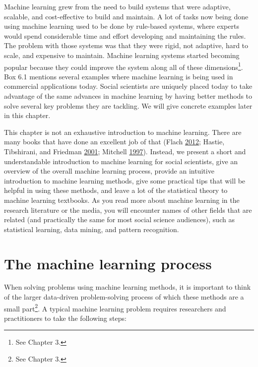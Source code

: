 \documentclass[]{krantz}
\begin{document}
Machine learning grew from the need to build systems that were adaptive,
scalable, and cost-effective to build and maintain. A lot of tasks now
being done using machine learning used to be done by rule-based systems,
where experts would spend considerable time and effort developing and
maintaining the rules. The problem with those systems was that they were
rigid, not adaptive, hard to scale, and expensive to maintain. Machine
learning systems started becoming popular because they could improve the
system along all of these dimensions\footnote{See Chapter 3.}. Box 6.1
mentions several examples where machine learning is being used in
commercial applications today. Social scientists are uniquely placed
today to take advantage of the same advances in machine learning by
having better methods to solve several key problems they are tackling.
We will give concrete examples later in this chapter.

This chapter is not an exhaustive introduction to machine learning.
There are many books that have done an excellent job of that (Flach
\protect\hyperlink{ref-Flach}{2012}; Hastie, Tibshirani, and Friedman
\protect\hyperlink{ref-HastieTibshirani}{2001}; Mitchell
\protect\hyperlink{ref-mitchell1997machine}{1997}). Instead, we present
a short and understandable introduction to machine learning for social
scientists, give an overview of the overall machine learning process,
provide an intuitive introduction to machine learning methods, give some
practical tips that will be helpful in using these methods, and leave a
lot of the statistical theory to machine learning textbooks. As you read
more about machine learning in the research literature or the media, you
will encounter names of other fields that are related (and practically
the same for most social science audiences), such as statistical
learning, data mining, and pattern recognition.

\section{The machine learning
process}\label{the-machine-learning-process}

When solving problems using machine learning methods, it is important to
think of the larger data-driven problem-solving process of which these
methods are a small part\footnote{See Chapter 3.}. A typical machine
learning problem requires researchers and practitioners to take the
following steps:
\end{document}
